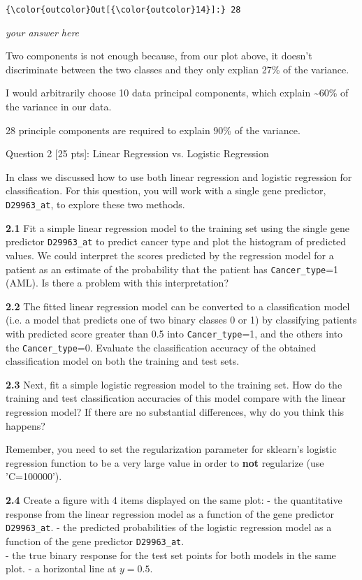 \documentclass[11pt]{article}
\begin{document}
\begin{Verbatim}[commandchars=\\\{\}]
{\color{outcolor}Out[{\color{outcolor}14}]:} 28
\end{Verbatim}
            
    \emph{your answer here}

Two components is not enough because, from our plot above, it doesn't
discriminate between the two classes and they only explian 27\% of the
variance.

I would arbitrarily choose 10 data principal components, which explain
\textasciitilde{}60\% of the variance in our data.

28 principle components are required to explain 90\% of the variance.

     Question 2 {[}25 pts{]}: Linear Regression vs. Logistic Regression

In class we discussed how to use both linear regression and logistic
regression for classification. For this question, you will work with a
single gene predictor, \texttt{D29963\_at}, to explore these two
methods.

\textbf{2.1} Fit a simple linear regression model to the training set
using the single gene predictor \texttt{D29963\_at} to predict cancer
type and plot the histogram of predicted values. We could interpret the
scores predicted by the regression model for a patient as an estimate of
the probability that the patient has \texttt{Cancer\_type}=1 (AML). Is
there a problem with this interpretation?

\textbf{2.2} The fitted linear regression model can be converted to a
classification model (i.e. a model that predicts one of two binary
classes 0 or 1) by classifying patients with predicted score greater
than 0.5 into \texttt{Cancer\_type}=1, and the others into the
\texttt{Cancer\_type}=0. Evaluate the classification accuracy of the
obtained classification model on both the training and test sets.

\textbf{2.3} Next, fit a simple logistic regression model to the
training set. How do the training and test classification accuracies of
this model compare with the linear regression model? If there are no
substantial differences, why do you think this happens?

Remember, you need to set the regularization parameter for sklearn's
logistic regression function to be a very large value in order to
\textbf{not} regularize (use 'C=100000').

\textbf{2.4} Create a figure with 4 items displayed on the same plot: -
the quantitative response from the linear regression model as a function
of the gene predictor \texttt{D29963\_at}. - the predicted probabilities
of the logistic regression model as a function of the gene predictor
\texttt{D29963\_at}.\\
- the true binary response for the test set points for both models in
the same plot. - a horizontal line at \(y=0.5\).
\end{document}
